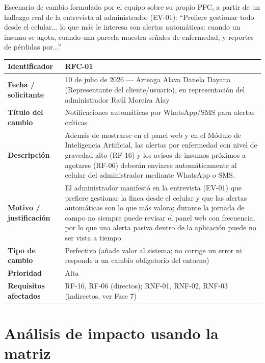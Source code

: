 \documentclass[12pt,a4paper]{article}
\begin{document}
Escenario de cambio formulado por el equipo sobre su propio PFC, a partir de un hallazgo real de la entrevista al administrador (EV-01): ``Prefiere gestionar todo desde el celular... lo que más le interesa son alertas automáticas: cuando un insumo se agota, cuando una parcela muestra señales de enfermedad, y reportes de pérdidas por...''

\begin{table}[H]
\centering
\begin{tabular}{@{}p{4cm}p{10cm}@{}}
\toprule
\textbf{Identificador} & RFC-01 \\
\midrule
\textbf{Fecha / solicitante} & 10 de julio de 2026 --- Arteaga Alava Danela Dayana (Representante del cliente/usuario), en representación del administrador Raúl Moreira Alay \\
\textbf{Título del cambio} & Notificaciones automáticas por WhatsApp/SMS para alertas críticas \\
\textbf{Descripción} & Además de mostrarse en el panel web y en el Módulo de Inteligencia Artificial, las alertas por enfermedad con nivel de gravedad alto (RF-16) y los avisos de insumos próximos a agotarse (RF-06) deberán enviarse automáticamente al celular del administrador mediante WhatsApp o SMS. \\
\textbf{Motivo / justificación} & El administrador manifestó en la entrevista (EV-01) que prefiere gestionar la finca desde el celular y que las alertas automáticas son lo que más valora; durante la jornada de campo no siempre puede revisar el panel web con frecuencia, por lo que una alerta pasiva dentro de la aplicación puede no ser vista a tiempo. \\
\textbf{Tipo de cambio} & Perfectivo (añade valor al sistema; no corrige un error ni responde a un cambio obligatorio del entorno) \\
\textbf{Prioridad} & Alta \\
\textbf{Requisitos afectados} & RF-16, RF-06 (directos); RNF-01, RNF-02, RNF-03 (indirectos, ver Fase 7) \\
\bottomrule
\end{tabular}
\end{table}

\section{ Análisis de impacto usando la matriz }
\end{document}

